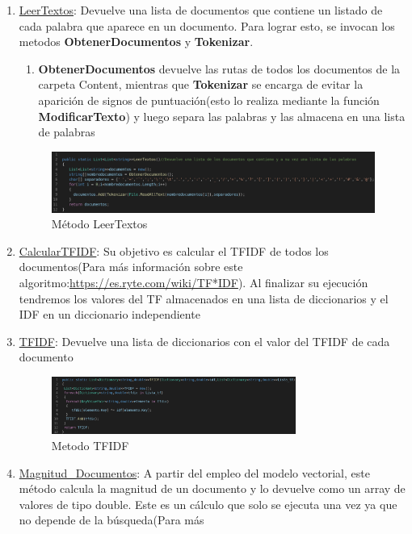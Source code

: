 \documentclass{article}
\begin{document}
 \begin{enumerate}
    \item \underline{LeerTextos}: Devuelve una lista de documentos que contiene un listado de cada palabra que aparece en un documento. Para lograr esto, se invocan los metodos \textbf{ObtenerDocumentos} y \textbf{Tokenizar}.
    \begin{enumerate}
        \item \textbf{ObtenerDocumentos} devuelve las rutas de todos los documentos de la carpeta Content, mientras que \textbf{Tokenizar} se encarga de 
        evitar la aparición de signos de puntuación(esto lo realiza mediante la función \textbf{ModificarTexto}) y luego
        separa las palabras y las almacena en una lista de palabras
    \end{enumerate}
  \begin{figure}[h]
    \centering
    \includegraphics[width = 15cm]{fig 1.png}
    \caption{Método LeerTextos}
    \label{fig:1}
  \end{figure}
      \item \underline{CalcularTFIDF}: Su objetivo es calcular el TFIDF de todos los documentos(Para
      más información sobre este algoritmo:\url{https://es.ryte.com/wiki/TF*IDF}). Al finalizar su
      ejecución tendremos los valores del TF almacenados en una lista de diccionarios y el IDF en
      un diccionario independiente
      \item \underline{TFIDF}: Devuelve una lista de diccionarios con el valor del TFIDF de cada
      documento
  \begin{figure}[h]
    \centering
    \includegraphics[width = 8cm]{fig 2.png}
    \caption{Metodo TFIDF}   
    \label{fig:2}
  \end{figure}
      \item \underline{Magnitud\_Documentos}: A partir del empleo del modelo vectorial, este método
      calcula la magnitud de un documento y lo devuelve como un array de valores de tipo double. 
      Este es un cálculo que solo se ejecuta una vez ya que no depende de la búsqueda(Para más 

\end{enumerate}
\end{document}

